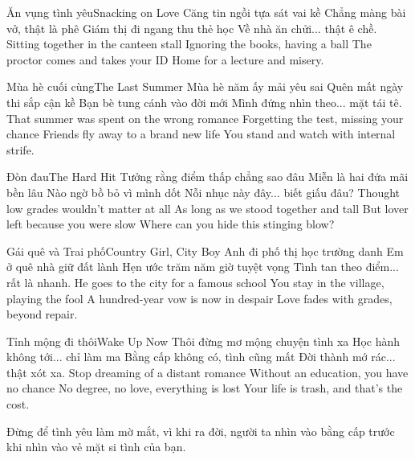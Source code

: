 \begin{tutuyetbox}{Ăn vụng tình yêu}{Snacking on Love}
Căng tin ngồi tựa sát vai kề
Chẳng màng bài vở, thật là phê
Giám thị đi ngang thu thẻ học
Về nhà ăn chửi... thật ê chề.
\tcblower
Sitting together in the canteen stall
Ignoring the books, having a ball
The proctor comes and takes your ID
Home for a lecture and misery.
\end{tutuyetbox}

\begin{tutuyetbox}{Mùa hè cuối cùng}{The Last Summer}
Mùa hè năm ấy mải yêu sai
Quên mất ngày thi sắp cận kề
Bạn bè tung cánh vào đời mới
Mình đứng nhìn theo... mặt tái tê.
\tcblower
That summer was spent on the wrong romance
Forgetting the test, missing your chance
Friends fly away to a brand new life
You stand and watch with internal strife.
\end{tutuyetbox}

\begin{tutuyetbox}{Đòn đau}{The Hard Hit}
Tưởng rằng điểm thấp chẳng sao đâu
Miễn là hai đứa mãi bền lâu
Nào ngờ bồ bỏ vì mình dốt
Nỗi nhục này đây... biết giấu đâu?
\tcblower
Thought low grades wouldn't matter at all
As long as we stood together and tall
But lover left because you were slow
Where can you hide this stinging blow?
\end{tutuyetbox}

\begin{tutuyetbox}{Gái quê và Trai phố}{Country Girl, City Boy}
Anh đi phố thị học trường danh
Em ở quê nhà giữ đất lành
Hẹn ước trăm năm giờ tuyệt vọng
Tình tan theo điểm... rất là nhanh.
\tcblower
He goes to the city for a famous school
You stay in the village, playing the fool
A hundred-year vow is now in despair
Love fades with grades, beyond repair.
\end{tutuyetbox}

\begin{tutuyetbox}{Tỉnh mộng đi thôi}{Wake Up Now}
Thôi đừng mơ mộng chuyện tình xa
Học hành không tới... chỉ làm ma
Bằng cấp không có, tình cũng mất
Đời thành mớ rác... thật xót xa.
\tcblower
Stop dreaming of a distant romance
Without an education, you have no chance
No degree, no love, everything is lost
Your life is trash, and that's the cost.
\end{tutuyetbox}

\begin{ghichu}
Đừng để tình yêu làm mờ mắt, vì khi ra đời, người ta nhìn vào bằng cấp trước khi nhìn vào vẻ mặt si tình của bạn.
\end{ghichu}
